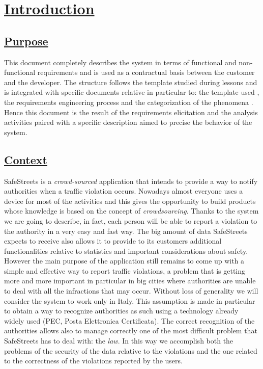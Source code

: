 \section[Introduction]{\hyperlink{toc}{Introduction}}
\label{sec:introduction}
\subsection[Purpose]{\hyperlink{toc}{Purpose}}
	\label{sec:purpose}
	This document completely describes the system in terms of functional and non-functional requirements and is used as a contractual basis between the customer and the developer. The structure follows the template studied during lessons and is integrated with specific documents relative in particular to: the template used \cite{IEEErasd}, the requirements engineering process \cite{IEEEre} and the categorization of the phenomena \cite{W&M}. Hence this document is the result of the requirements elicitation and the analysis activities paired with a specific description aimed to precise the behavior of the system.
	
\subsection[Context]{\hyperlink{toc}{Context}}
	SafeStreets is a \emph{crowd-sourced} application that intends to provide a way to notify authorities when a traffic violation occurs. Nowadays almost everyone uses a device for most of the activities and this gives the opportunity to build products whose knowledge is based on the concept of \emph{crowdsourcing}. Thanks to the system we are going to describe, in fact, each person will be able to report a violation to the authority in a very easy and fast way. The big amount of data SafeStreets expects to receive also allows it to provide to its customers additional functionalities relative to statistics and important considerations about safety. However the main purpose of the application still remains to come up with a simple and effective way to report traffic violations, a problem that is getting more and more important in particular in big cities where authorities are unable to deal with all the infractions that may occur. Without loss of generality we will consider the system to work only in Italy. This assumption is made in particular to obtain a way to recognize authorities as such using a technology already widely used (PEC, Posta Elettronica Certificata). The correct recognition of the authorities allows also to manage correctly one of the most difficult problem that SafeStreets has to deal with: the \emph{law}. In this way we accomplish both the problems of the security of the data relative to the violations and the one related to the correctness of the violations reported by the users.
	
